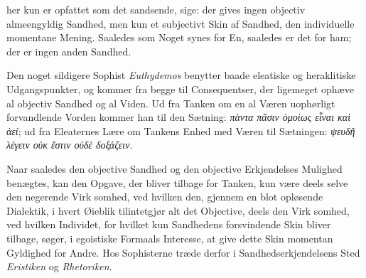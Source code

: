 \documentclass[12pt,a4paper]{book}
\newcommand{\gk}[1]{\textit{#1}}
\begin{document}
%
%
%
her kun er opfattet som det sandsende, sige: der gives ingen
objectiv almeengyldig Sandhed, men kun et subjectivt Skin af
Sandhed, den individuelle momentane Mening. Saaledes som
Noget synes for En, saaledes er det for ham; der er ingen
anden Sandhed.

Den noget sildigere Sophist \emph{Euthydemos} benytter baade
eleatiske og heraklitiske Udgangspunkter, og kommer fra begge
til Consequentser, der ligemeget ophæve al objectiv Sandhed og al
Viden. Ud fra Tanken om en al Væren uophørligt forvandlende
Vorden kommer han til den Sætning: \gk{πὰντα πᾶσιν ὁμοίως εἶναι
καὶ ἀεί}; ud fra Eleaternes Lære om Tankens Enhed med Væren
til Sætningen: \gk{ψευδῆ λέγειν οὐκ ἔστιν οὐδὲ δοξάζειν}.

Naar saaledes den objective Sandhed og den objective
Erkjendelses Mulighed benægtes, kan den Opgave, der bliver
tilbage for Tanken, kun være deels selve den negerende Virk\-%
somhed, ved hvilken den, gjennem en blot opløsende Dialektik,
i hvert Øieblik tilintetgjør alt det Objective, deels den Virk\-%
somhed, ved hvilken Individet, for hvilket kun Sandhedens
forsvindende Skin bliver tilbage, søger, i egoistiske Formaals
Interesse, at give dette Skin momentan Gyldighed for Andre.
Hos Sophisterne træde derfor i Sandhedserkjendelsens Sted
\emph{Eristiken} og \emph{Rhetoriken}.
\end{document}
